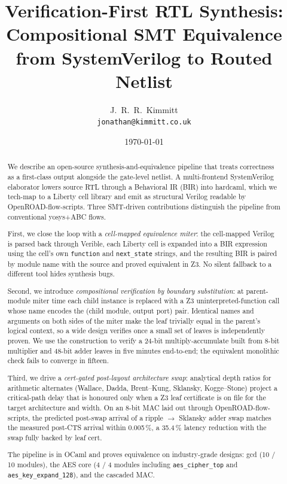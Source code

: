 \documentclass[11pt,a4paper]{article}
\title{Verification-First RTL Synthesis:\\
       Compositional SMT Equivalence from SystemVerilog to Routed Netlist}
\author{J.~R.~R.~Kimmitt\\
        \texttt{jonathan@kimmitt.co.uk}}
\date{\today}
\begin{document}
\maketitle

\begin{abstract}
We describe an open-source synthesis-and-equivalence pipeline that
treats correctness as a first-class output alongside the gate-level
netlist.  A multi-frontend SystemVerilog elaborator lowers source
RTL through a Behavioral IR (BIR) into hardcaml, which we tech-map
to a Liberty cell library and emit as structural Verilog readable by
OpenROAD-flow-scripts.  Three SMT-driven contributions distinguish
the pipeline from conventional yosys+ABC flows.

First, we close the loop with a \emph{cell-mapped equivalence
miter}: the cell-mapped Verilog is parsed back through Verible,
each Liberty cell is expanded into a BIR expression using the
cell's own \texttt{function} and \texttt{next\_state} strings, and
the resulting BIR is paired by module name with the source and
proved equivalent in Z3.  No silent fallback to a different tool
hides synthesis bugs.

Second, we introduce \emph{compositional verification by boundary
substitution}: at parent-module miter time each child instance is
replaced with a Z3 uninterpreted-function call whose name encodes
the (child module, output port) pair.  Identical names and
arguments on both sides of the miter make the leaf trivially equal
in the parent's logical context, so a wide design verifies once a
small set of leaves is independently proven.  We use the
construction to verify a 24-bit multiply-accumulate built from
8-bit multiplier and 48-bit adder leaves in five minutes
end-to-end; the equivalent monolithic check fails to converge in
fifteen.

Third, we drive a \emph{cert-gated post-layout architecture swap}:
analytical depth ratios for arithmetic alternates (Wallace, Dadda,
Brent--Kung, Sklansky, Kogge--Stone) project a critical-path delay
that is honoured only when a Z3 leaf certificate is on file for the
target architecture and width.  On an 8-bit MAC laid out through
OpenROAD-flow-scripts, the predicted post-swap arrival of a ripple
$\rightarrow$ Sklansky adder swap matches the measured post-CTS
arrival within 0.005\,\%, a 35.4\,\% latency reduction with the
swap fully backed by leaf cert.

The pipeline is in OCaml and proves equivalence on industry-grade
designs: gcd (10 / 10 modules), the AES core (4 / 4 modules
including \texttt{aes\_cipher\_top} and \texttt{aes\_key\_expand\_128}),
and the cascaded MAC.
\end{abstract}
\end{document}
